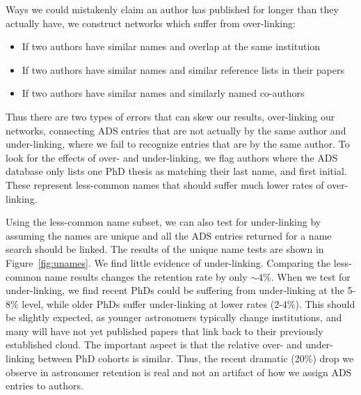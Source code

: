 \documentclass{emulateapj}
\begin{document}
Ways we could mistakenly claim an author has published for longer than they actually have, we construct networks which suffer from over-linking:
\begin{itemize}
\item{If two authors have similar names and overlap at the same institution}
\item{If two authors have similar names and similar reference lists in their papers}
  \item{If two authors have similar names and similarly named co-authors}
\end{itemize}

Thus there are two types of errors that can skew our results, over-linking our networks, connecting ADS entries that are not actually by the same author and under-linking, where we fail to recognize entries that are by the same author.  To look for the effects of over- and under-linking, we flag authors where the ADS database only lists one PhD thesis as matching their last name, and first initial. These represent less-common names that should suffer much lower rates of over-linking.

Using the less-common name subset, we can also test for under-linking by assuming the names are unique and all the ADS entries returned for a name search should be linked.  The results of the unique name tests are shown in Figure~\ref{fig:unames}. We find little evidence of under-linking. Comparing the less-common name results changes the retention rate by only $\sim4$\%. When we test for under-linking, we find recent PhDs could be suffering from under-linking at the 5-8\% level, while older PhDs suffer under-linking at lower rates (2-4\%).  This should be slightly expected, as younger astronomers typically change institutions, and many will have not yet published papers that link back to their previously established cloud.  The important aspect is that the relative over- and under-linking between PhD cohorts is similar.  Thus, the recent dramatic (20\%) drop we observe in astronomer retention is real and not an artifact of how we assign ADS entries to authors.

\begin{figure*}
  \caption{Solid lines show the residuals when comparing to retention curves constructed with unique names (e.g., a sub-sample that should suffer from little to no over-linking).  The dashed lines shows the comparision to unique names when the unique name group is assumed to have a completely linked network (e.g., a subsample that suffers from little to no under-linking).  \label{fig:unames}}
  \end{figure*}
\end{document}
